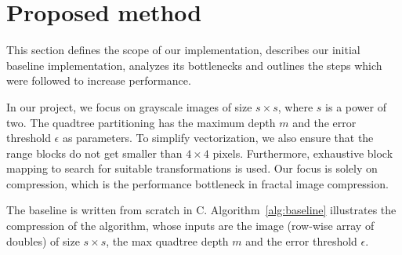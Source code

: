 \section{Proposed method}\label{sec:yourmethod}

This section defines the scope of our implementation, describes our initial baseline
implementation, analyzes its bottlenecks and outlines the steps which were followed to
increase performance.

 In our project, we focus on grayscale images of size $s \times s$,
where $s$ is a power of two. The quadtree partitioning has the maximum depth $m$
and the error threshold $\epsilon$ as parameters. To simplify vectorization, we
also ensure that the range blocks do not get smaller than $4 \times 4$ pixels.
Furthermore, exhaustive block mapping to search for suitable transformations is
used. Our focus is solely on compression, which is the performance bottleneck in
fractal image compression.

The baseline is written from scratch in C. Algorithm~\ref{alg:baseline} illustrates the compression of the algorithm,
whose inputs are the image (row-wise array of doubles) of size $s \times s$, the max quadtree depth $m$ and the error threshold $\epsilon$.

